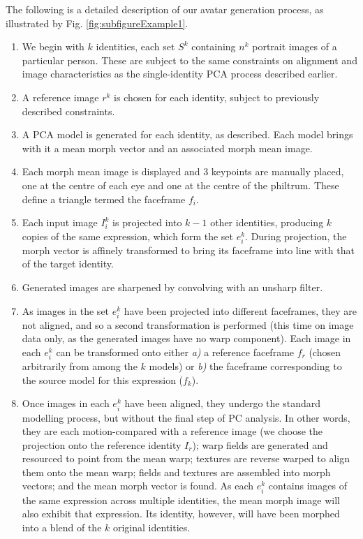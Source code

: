 \documentclass[runningheads]{llncs}
\begin{document}
The following is a detailed description of our avatar generation process, as illustrated by Fig. \ref{fig:subfigureExample1}.

\begin{enumerate}


\item	We begin with $k$ identities, each set $S^k$ containing $n^k$ portrait images of a particular person. These are subject to the same constraints on alignment and image characteristics as the single-identity PCA process described earlier.
\item	A reference image $r^k$ is chosen for each identity, subject to previously described constraints.
\item	A PCA model is generated for each identity, as described. Each  model brings with it a mean morph vector and an associated morph mean image.
\item	Each morph mean image is displayed and 3 keypoints are manually placed, one at the centre of each eye and one at the centre of the philtrum. These define a triangle termed the faceframe $f_i$.
\item Each input image $I^k_i$ is projected into $k-1$ other identities, producing $k$ copies of the same expression, which form the set $e^k_i$. During projection, the morph vector is affinely transformed to bring its faceframe into line with that of the target identity.
\item	Generated images are sharpened by convolving with an unsharp filter\cite{polesel2000image}.
\item	As images in the set $e^k_i$ have been projected into different faceframes, they are not aligned, and so a second transformation is performed (this time on image data only, as the generated images have no warp component). Each image in each $e^k_i$ can be transformed onto either \textit{a)} a reference faceframe $f_r$ (chosen arbitrarily from among the $k$ models) or \textit{b)} the faceframe corresponding to the source model for this expression ($f_k$).
\item	Once images in each $e^k_i$ have been aligned, they undergo the standard modelling process, but without the final step of PC analysis. In other words, they are each motion-compared with a reference image (we choose the projection onto the reference identity $I_r$); warp fields are generated and resourced to point from the mean warp; textures are reverse warped to align them onto the mean warp; fields and textures are assembled into morph vectors; and the mean morph vector is found. As each $e^k_i$ contains images of the same expression across multiple identities, the mean morph image will also exhibit that expression. Its identity, however, will have been morphed into a blend of the $k$ original identities.

\end{enumerate}
\end{document}
